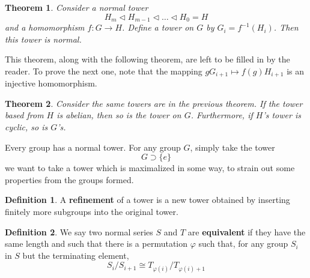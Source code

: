 \documentclass[12pt]{amsbook}
\theoremstyle{plain}
\newtheorem{theorem}{Theorem}[chapter]
\theoremstyle{definition}
\newtheorem{definition}{Definition}
\begin{document}
\begin{theorem}
    Consider a normal tower
    \[ H_m \lhd H_{m-1} \lhd \dots \lhd H_0 = H \]
    and a homomorphism $f:G \to H$. Define a tower on $G$ by $G_i = f^{-1}(H_i)$. Then this tower is normal.
\end{theorem}

This theorem, along with the following theorem, are left to be filled in by the reader. To prove the next one, note that the mapping $gG_{i+1} \mapsto f(g)H_{i+1}$ is an injective homomorphism.

\begin{theorem}
    Consider the same towers are in the previous theorem. If the tower based from $H$ is abelian, then so is the tower on $G$. Furthermore, if $H$'s tower is cyclic, so is $G$'s.
\end{theorem}

Every group has a normal tower. For any group $G$, simply take the tower
%
\[ G \supset \{e\} \]
%
we want to take a tower which is maximalized in some way, to strain out some properties from the groups formed.

\begin{definition}
    A {\bf refinement}  of a tower is a new tower obtained by inserting finitely more subgroups into the original tower.
\end{definition}

\begin{definition}
    We say two normal series $S$ and $T$ are {\bf equivalent}  if they have the same length and such that there is a permutation $\varphi$ such that, for any group $S_i$ in $S$ but the terminating element,
    \[ S_i/S_{i+1} \cong T_{\varphi(i)}/T_{\varphi(i) + 1} \]
\end{definition}
\end{document}
